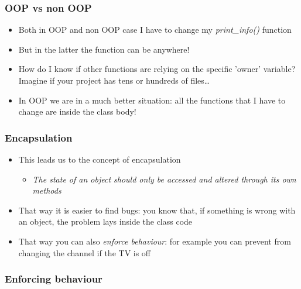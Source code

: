 \documentclass[9pt]{beamer}
\begin{document}
\begin{frame}
  \frametitle{OOP vs non OOP}
  
  \begin{itemize}
    \item Both in OOP and non OOP case I have to change my \emph{print\_info()} function 
    \bigskip
    \item But in the latter the function can be anywhere!
    \bigskip
    \item How do I know if other functions are relying on the specific 'owner' variable? Imagine if your project has tens or hundreds of files\dots
    \bigskip
    \item In OOP we are in a much better situation: all the functions that I have to change are inside the class body!
  \end{itemize}

\end{frame}


\begin{frame}
  \frametitle{Encapsulation}
  
  \begin{itemize}
    \item This leads us to the concept of \alert{encapsulation} 
    \bigskip
    \begin{itemize}
      \item \emph{The state of an object should only be accessed and altered through its own methods}
    \end{itemize}
    \bigskip
    \item That way it is easier to find bugs: you know that, if something is wrong
          with an object, the problem lays inside the class code
    \bigskip
    \item That way you can also \emph{enforce behaviour}: for example you can
          prevent from changing the channel if the TV is off
    
  \end{itemize}

\end{frame}


\begin{frame}
  \frametitle{Enforcing behaviour}
  
\end{frame}
\end{document}
